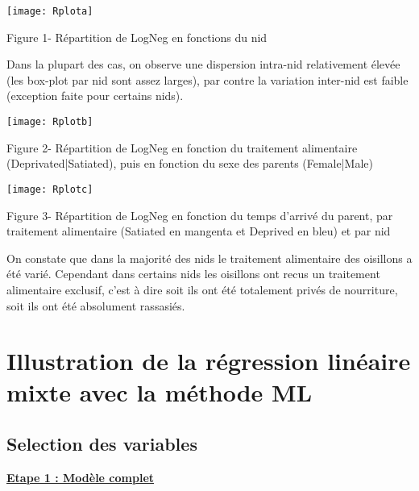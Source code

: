 \documentclass[11pt,fleqn]{book} %
\begin{document}
\texttt{[image: Rplota]}
\begin{center} Figure 1- Répartition de LogNeg en fonctions du nid\end{center}

\vspace{1em}

Dans la plupart des cas, on observe une dispersion intra-nid relativement élevée (les box-plot par nid sont assez larges), par contre la variation inter-nid est faible (exception faite pour certains nids).

\newpage

\texttt{[image: Rplotb]}
\begin{center} Figure 2- Répartition de LogNeg en fonction du traitement alimentaire (Deprivated\:|\:Satiated), puis en fonction du sexe des parents (Female\:|\:Male)\end{center}

\vspace{2em}

\texttt{[image: Rplotc]}
\begin{center} Figure 3- Répartition de LogNeg en fonction du temps d'arrivé du parent, par traitement alimentaire (Satiated en mangenta  et Deprived en bleu) et par nid \end{center}

\vspace{2em}

On constate que dans la majorité des nids le traitement alimentaire des oisillons a été varié. Cependant dans certains nids les oisillons ont recus un traitement alimentaire exclusif, c'est à dire soit ils ont été totalement privés de nourriture, soit ils ont été absolument rassasiés.

 
\newpage

\section{Illustration de la régression linéaire mixte avec la méthode ML }

\vspace{1em}

\subsection{Selection des variables} 

\vspace{1em}

\underline{\textbf{Etape 1 : Modèle complet}}
\end{document}
